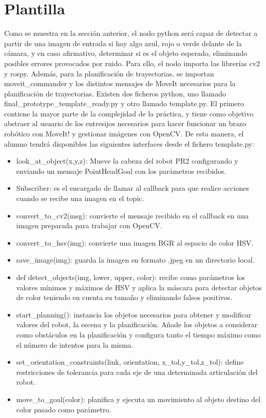 \documentclass[12pt,spanish,chapterprefix, numbers=noenddot]{book}
\numberwithin{equation}{section}
\numberwithin{figure}{section}
\begin{document}
\section{Plantilla}
Como se muestra en la sección anterior, el nodo python será capaz de detectar a partir de una imagen de entrada si hay algo azul, rojo o verde delante de la cámara, y en caso afirmativo, determinar si es el objeto esperado, eliminando posibles errores provocados por ruido. 
Para ello, el nodo importa las librerías cv2 y rospy. Además, para la planificación de trayectorias, se importan moveit\_commander y los distintos mensajes de MoveIt necesarios para la planificación de trayectorias.
Existen dos ficheros python, uno llamado final\_prototype\_template\_ready.py y otro llamado template.py. 
El primero contiene la mayor parte de la complejidad de la práctica, y tiene como objetivo abstraer al usuario de los entresijos necesarios para hacer funcionar un brazo robótico con MoveIt! y gestionar imágenes con OpenCV. 
De esta manera, el alumno tendrá disponibles las siguientes interfaces desde el fichero template.py: 

\begin{itemize}
\item look\_at\_object(x,y,z): Mueve la cabeza del robot PR2 configurando y enviando un mensaje PointHeadGoal con los parámetros recibidos.
\item Subscriber: es el encargado de llamar al callback para que realice acciones cuando se recibe una imagen en el topic.
\item convert\_to\_cv2(msg): convierte el mensaje recibido en el callback en una imagen preparada para trabajar con OpenCV.
\item convert\_to\_hsv(img): convierte una imagen BGR al espacio de color HSV. 
\item save\_image(img): guarda la imagen en formato .jpeg en un directorio local. 
\item def detect\_objects(img, lower, upper, color): recibe como parámetros los valores mínimos y máximos de HSV y aplica la máscara para detectar objetos de color teniendo en cuenta su tamaño y eliminando falsos positivos. 
\item start\_planning(): instancia los objetos necesarios para obtener y modificar valores del robot, la escena y la planificación. Añade los objetos a considerar como obstáculos en la planificación y configura tanto el tiempo máximo como el número de intentos para la misma. 
\item set\_orientation\_constraints(link, orientation, x\_tol,y\_tol,z\_tol): define restricciones de tolerancia para cada eje de una determinada articulación del robot. 
\item move\_to\_goal(color): planifica y ejecuta un movimiento al objeto destino del color pasado como parámetro. 
\end{itemize}
\end{document}
